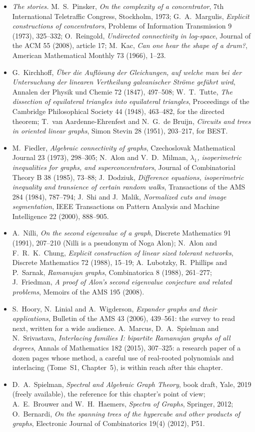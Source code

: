 \begin{itemize}
\item \emph{The stories.} M.~S.~Pinsker, \emph{On the complexity of a concentrator}, 7th International Teletraffic Congress, Stockholm, 1973; G.~A.~Margulis, \emph{Explicit constructions of
concentrators}, Problems of Information Transmission 9 (1973), 325--332; O.~Reingold, \emph{Undirected connectivity in log-space}, Journal of the ACM 55 (2008), article 17; M.~Kac, \emph{Can one hear the shape of a drum?}, American Mathematical Monthly 73 (1966), 1--23.
\item G.~Kirchhoff, \emph{\"Uber die Aufl\"osung der Gleichungen, auf welche man bei der Untersuchung der linearen Vertheilung galvanischer Str\"ome gef\"uhrt wird}, Annalen der Physik
und Chemie 72 (1847), 497--508; W.~T.~Tutte, \emph{The dissection of equilateral triangles into equilateral triangles}, Proceedings of the Cambridge Philosophical Society 44 (1948),
463--482, for the directed theorem; T.~van Aardenne-Ehrenfest and N.~G.~de Bruijn, \emph{Circuits and trees in oriented linear graphs}, Simon Stevin 28 (1951), 203--217, for BEST.
\item M.~Fiedler, \emph{Algebraic connectivity of graphs}, Czechoslovak Mathematical Journal 23 (1973), 298--305; N.~Alon and V.~D.~Milman, \emph{$\lambda_1$, isoperimetric inequalities for graphs, and
superconcentrators}, Journal of Combinatorial Theory B 38 (1985), 73--88; J.~Dodziuk, \emph{Difference equations, isoperimetric inequality and transience of certain random walks}, Transactions
of the AMS 284 (1984), 787--794; J.~Shi and J.~Malik, \emph{Normalized cuts and image segmentation}, IEEE Transactions on Pattern Analysis and Machine Intelligence 22 (2000), 888--905.
\item A.~Nilli, \emph{On the second eigenvalue of a graph}, Discrete Mathematics 91 (1991), 207--210 (Nilli is a pseudonym of Noga Alon); N.~Alon and F.~R.~K.~Chung, \emph{Explicit construction
of linear sized tolerant networks}, Discrete Mathematics 72 (1988), 15--19; A.~Lubotzky, R.~Phillips and P.~Sarnak, \emph{Ramanujan graphs}, Combinatorica 8 (1988), 261--277; J.~Friedman,
\emph{A proof of Alon's second eigenvalue conjecture and related problems}, Memoirs of the AMS 195 (2008).
\item S.~Hoory, N.~Linial and A.~Wigderson, \emph{Expander graphs and their applications}, Bulletin of the AMS 43 (2006), 439--561: the survey to read next, written for a wide audience. A.~Marcus, D.~A.~Spielman
and N.~Srivastava, \emph{Interlacing families I: bipartite Ramanujan graphs of all degrees}, Annals of Mathematics 182 (2015), 307--325: a research paper of a dozen pages whose method, a careful use of
real-rooted polynomials and interlacing (Tome~S1, Chapter~5), is within reach after this chapter.
\item D.~A.~Spielman, \emph{Spectral and Algebraic Graph Theory}, book draft, Yale, 2019 (freely available), the reference for this chapter's point of view; A.~E.~Brouwer and W.~H.~Haemers,
\emph{Spectra of Graphs}, Springer, 2012; O.~Bernardi, \emph{On the spanning trees of the hypercube and other products of graphs}, Electronic Journal of Combinatorics 19(4) (2012), P51.
\end{itemize}
